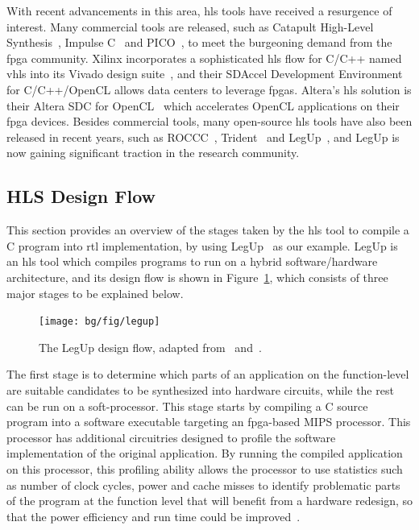 With recent advancements in this area, \gls{hls} tools have received a
resurgence of interest.  Many commercial tools are released, such as Catapult
High-Level Synthesis~\cite{catapultc}, Impulse C~\cite{impulsec} and
PICO~\cite{schreiber02}, to meet the burgeoning demand from the \gls{fpga}
community.  Xilinx incorporates a sophisticated \gls{hls} flow for C/C++
named \gls{vhls} into its Vivado design suite~\cite{vivado_ds}, and their
SDAccel Development Environment~\cite{sdaccel} for C/C++/OpenCL allows data
centers to leverage \glspl{fpga}.  Altera's \gls{hls} solution is their Altera
SDC for OpenCL~\cite{aoc} which accelerates OpenCL applications on their
\gls{fpga} devices.  Besides commercial tools, many open-source \gls{hls}
tools have also been released in recent years, such as ROCCC~\cite{roccc},
Trident~\cite{tripp05} and LegUp~\cite{legup}, and LegUp is now gaining
significant traction in the research community.


\subsection{HLS Design Flow}
\label{bg:sub:hls_design}

This section provides an overview of the stages taken by the \gls{hls}
tool to compile a C program into \gls{rtl} implementation, by using
LegUp~\cite{legup, canis13} as our example.  LegUp is an \gls{hls} tool which
compiles programs to run on a hybrid software/hardware architecture, and its
design flow is shown in Figure~\ref{bg:fig:legup}, which consists of three
major stages to be explained below.
\begin{figure}[ht]
    \centering
    \texttt{[image: bg/fig/legup]}
    \caption{%
        The LegUp design flow, adapted from~\cite{canis13} and~\cite{legup}.
    }\label{bg:fig:legup}
\end{figure}

The first stage is to determine which parts of an application on the
function-level are suitable candidates to be synthesized into hardware
circuits, while the rest can be run on a soft-processor.  This stage starts
by compiling a C source program into a software executable targeting an
\gls{fpga}-based MIPS processor.  This processor has additional circuitries
designed to profile the software implementation of the original application.
By running the compiled application on this processor, this profiling ability
allows the processor to use statistics such as number of clock cycles, power
and cache misses to identify problematic parts of the program at the function
level that will benefit from a hardware redesign, so that the power efficiency
and run time could be improved~\cite{canis13}.

